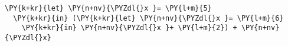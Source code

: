 \begin{Verbatim}[commandchars=\\\{\}]
\PY{k+kr}{let} \PY{n+nv}{\PYZdl{}x }= \PY{l+m}{5}
  \PY{k+kr}{in} (\PY{k+kr}{let} \PY{n+nv}{\PYZdl{}x }= \PY{l+m}{6}
    \PY{k+kr}{in} \PY{n+nv}{\PYZdl{}x }+ \PY{l+m}{2}) + \PY{n+nv}{\PYZdl{}x}
\end{Verbatim}
